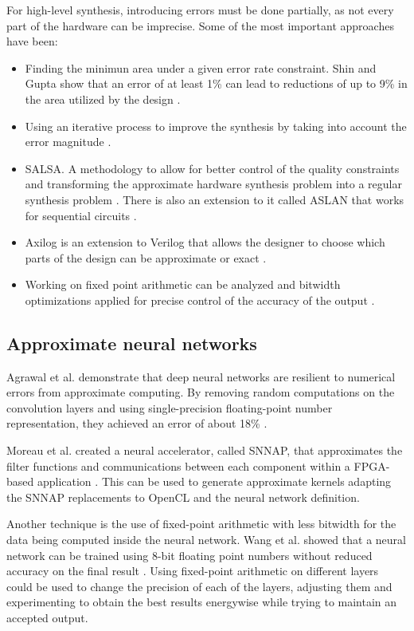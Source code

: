 For high-level synthesis, introducing errors must be done partially, as not every
part of the hardware can be imprecise. Some of the most important approaches have been:

\begin{itemize}
  \item Finding the minimun area under a given error rate constraint. Shin and Gupta
  show that an error of at least 1\% can lead to reductions of up to 9\% in the area
  utilized by the design \cite{shin2010approximate}.
  \item Using an iterative process to improve the synthesis by taking into account
  the error magnitude \cite{miao2013approximate}.
  \item SALSA. A methodology to allow for better control of the quality constraints
  and transforming the approximate hardware synthesis problem into a regular synthesis
  problem \cite{venkataramani2012salsa}. There is also an extension to it called ASLAN
  that works for sequential circuits \cite{ranjan2014aslan}.
  \item Axilog is an extension to Verilog that allows the designer to choose which parts
  of the design can be approximate or exact \cite{yazdanbakhsh2015axilog}.
  \item Working on fixed point arithmetic can be analyzed and bitwidth optimizations
  applied for precise control of the accuracy of the output \cite{li2015joint}.
\end{itemize}

\subsection{Approximate neural networks}

Agrawal et al. demonstrate that deep neural networks are resilient to numerical errors
from approximate computing. By removing random computations on the convolution layers 
and using single-precision floating-point number representation, they achieved an error
of about 18\% \cite{approximatecomp}.

Moreau et al. created a neural accelerator, called SNNAP, that approximates the filter functions and
communications between each component within a FPGA-based application \cite{moreau2015snnap}. This can be used
to generate approximate kernels adapting the SNNAP replacements to OpenCL and the neural network
definition.

Another technique is the use of fixed-point arithmetic with less bitwidth for the data being
computed inside the neural network. Wang et al. showed that a neural network can be 
trained using 8-bit floating point numbers without reduced accuracy on the final result \cite{wang2018training}.
Using fixed-point arithmetic on different layers could be used to change the precision of
each of the layers, adjusting them and experimenting to obtain the best results energywise
while trying to maintain an accepted output.

